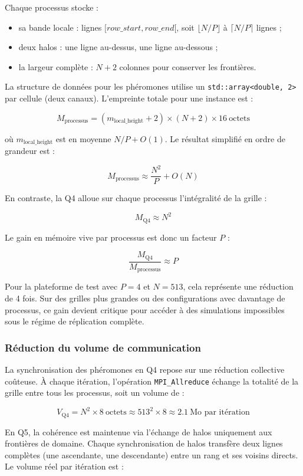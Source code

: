 \documentclass[11pt,a4paper]{article}
\begin{document}
Chaque processus stocke :
\begin{itemize}[leftmargin=1.2em]
  \item sa bande locale : lignes $[row\_start, row\_end[$, soit $\lfloor N / P \rfloor$ à $\lceil N / P \rceil$ lignes ;
  \item deux halos : une ligne au-dessus, une ligne au-dessous ;
  \item la largeur complète : $N + 2$ colonnes pour conserver les frontières.
\end{itemize}

La structure de données pour les phéromones utilise un \texttt{std::array<double, 2>} par cellule (deux canaux). L'empreinte totale pour une instance est :

\[
M_{\text{processus}} = (m_{\text{local\_height}} + 2) \times (N + 2) \times 16\ \text{octets}
\]

où $m_{\text{local\_height}}$ est en moyenne $N / P + O(1)$. Le résultat simplifié en ordre de grandeur est :

\[
M_{\text{processus}} \approx \frac{N^2}{P} + O(N)
\]

En contraste, la Q4 alloue sur chaque processus l'intégralité de la grille :

\[
M_{\text{Q4}} \approx N^2
\]

Le gain en mémoire vive par processus est donc un facteur $P$ :

\[
\frac{M_{\text{Q4}}}{M_{\text{processus}}} \approx P
\]

Pour la plateforme de test avec $P = 4$ et $N = 513$, cela représente une réduction de 4 fois. Sur des grilles plus grandes ou des configurations avec davantage de processus, ce gain devient critique pour accéder à des simulations impossibles sous le régime de réplication complète.

\subsubsection{Réduction du volume de communication}

La synchronisation des phéromones en Q4 repose sur une réduction collective coûteuse. À chaque itération, l'opération \texttt{MPI\_Allreduce} échange la totalité de la grille entre tous les processus, soit un volume de :

\[
V_{\text{Q4}} = N^2 \times 8\ \text{octets} \approx 513^2 \times 8 \approx 2.1\ \text{Mo par itération}
\]

En Q5, la cohérence est maintenue via l'échange de halos uniquement aux frontières de domaine. Chaque synchronisation de halos transfère deux lignes complètes (une ascendante, une descendante) entre un rang et ses voisins directs. Le volume réel par itération est :
\end{document}
